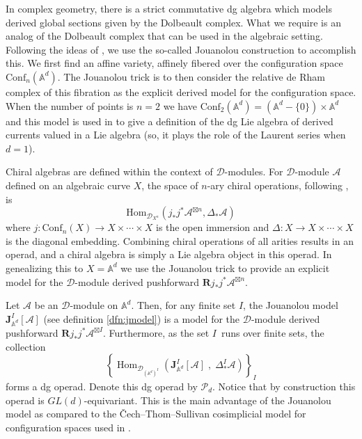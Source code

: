 \documentclass[11pt]{amsart}
\theoremstyle{definition}
\theoremstyle{remark}
\numberwithin{equation}{section}
\newcommand{\op}{\operatorname}
\begin{document}
In complex geometry, there is a strict commutative dg algebra which models derived global sections given by the Dolbeault
complex.
What we require is an analog of the Dolbeault complex that can be used in the algebraic setting.
Following the ideas of \cite{FHK}, we use the so-called Jouanolou construction to accomplish this.
We first find an affine variety, affinely fibered over the configuration space $\mathrm{Conf}_n(\mathbb{A}^d)$.
The Jouanolou trick is to then consider the relative de Rham complex of this fibration as the explicit derived model
for the configuration space.
When the number of points is $n=2$ we have $\mathrm{Conf}_2(\mathbb{A}^d) = (\mathbb{A}^d - \{0\})\times \mathbb{A}^d$ and this model is used in \cite{FHK} to give a definition of the dg Lie algebra of
derived currents valued in a Lie algebra (so, it plays the role of the Laurent series when $d=1$).

Chiral algebras are defined within the context of $\mathcal{D}$-modules.
For $\mathcal{D}$-module $\mathcal{A}$ defined on an algebraic curve $X$, the space of $n$-ary chiral operations, following \cite{BD}, is
\begin{equation}\label{}
  \mathrm{Hom}_{\mathcal{D}_{X^{n}}}\left(j_{*}j^*\mathcal{A}^{\boxtimes{n}},\Delta_* \mathcal{A}\right)
\end{equation}
where $j \colon \mathrm{Conf}_n(X) \to X \times \cdots \times X$ is the open immersion and $\Delta \colon X \to X \times
\cdots \times X$ is the diagonal embedding.
Combining chiral operations of all arities results in an operad, and a chiral algebra is simply a Lie algebra object in
this operad.
In genealizing this to $X = \mathbb{A}^d$ we use the Jouanolou trick to provide an explicit model for the $\mathcal{D}
$-module derived pushforward $\mathbf{R} j_* j^* \mathcal{A}^{\boxtimes n}$.

  Let $\mathcal{A}$ be an $\mathcal{D}$-module on $\mathbb{A}^d$.
  Then, for any finite set $I$, the Jouanolou model $\mathbf{J}_{\mathbb{A}^d}^I[\mathcal{A}]$ (see definition
  \ref{dfn:jmodel}) is a model for the $\mathcal{D}$-module derived pushforward $\mathbf{R} j_* j^* \mathcal{A}
  ^{\boxtimes I}$.
  Furthermore, as the set $I$~runs over finite sets, the collection
  \begin{equation}\label{}
    \left\{\op{Hom}_{\mathcal{D}_{(\mathbb{A}^{d})^I}} \left(\mathbf{J}^I_{\mathbb{A}^d} [\mathcal{A}] \; ,
    \; \Delta_*^I \mathcal{A} \right) \right\}_{I}
  \end{equation}
  forms a dg operad.
  Denote this dg operad by $\mathcal{P}_d$.
  Notice that by construction this operad is $GL(d)$-equivariant.
  This is the main advantage of the Jouanolou model as compared to the \v{C}ech--Thom--Sullivan cosimplicial model for configuration spaces used in \cite{FGY}.
\end{document}
